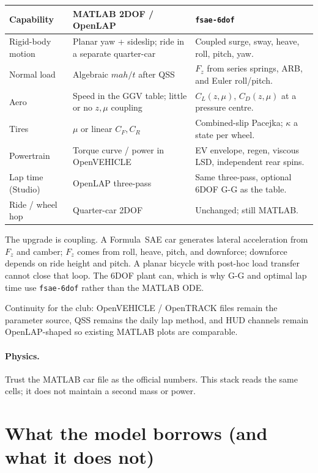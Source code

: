 \documentclass[11pt,letterpaper]{article}
\newcommand{\eng}[1]{\paragraph{Physics.} #1}
\begin{document}
\begin{center}
\begin{tabular}{@{}p{}p{}p{}@{}}
\toprule
Capability & MATLAB 2DOF / OpenLAP & \texttt{fsae-6dof} \\
\midrule
Rigid-body motion
  & Planar yaw + sideslip; ride in a separate quarter-car
  & Coupled surge, sway, heave, roll, pitch, yaw. \\
Normal load
  & Algebraic $m a h/t$ after QSS
  & $F_z$ from series springs, ARB, and Euler roll/pitch. \\
Aero
  & Speed in the GGV table; little or no $z,\mu$ coupling
  & $C_L(z,\mu)$, $C_D(z,\mu)$ at a pressure centre. \\
Tires
  & $\mu$ or linear $C_F,C_R$
  & Combined-slip Pacejka; $\kappa$ a state per wheel. \\
Powertrain
  & Torque curve / power in OpenVEHICLE
  & EV envelope, regen, viscous LSD, independent rear spins. \\
Lap time (Studio)
  & OpenLAP three-pass
  & Same three-pass, optional 6DOF G-G as the table. \\
Ride / wheel hop
  & Quarter-car 2DOF
  & Unchanged; still MATLAB. \\
\bottomrule
\end{tabular}
\end{center}

The upgrade is coupling. A Formula~SAE car generates lateral
acceleration from $F_z$ and camber; $F_z$ comes from roll, heave,
pitch, and downforce; downforce depends on ride height and pitch. A
planar bicycle with post-hoc load transfer cannot close that loop.
The 6DOF plant can, which is why G-G and optimal lap time use
\texttt{fsae-6dof} rather than the MATLAB ODE.

Continuity for the club: OpenVEHICLE / OpenTRACK files remain the
parameter source, QSS remains the daily lap method, and HUD channels
remain OpenLAP-shaped so existing MATLAB plots are comparable.

\eng{Trust the MATLAB car file as the official numbers. This stack
reads the same cells; it does not maintain a second mass or power.}

\section{What the model borrows (and what it does not)}
\label{sec:borrows}
\end{document}
